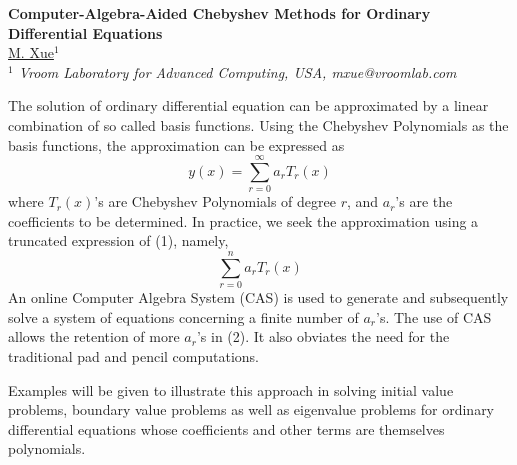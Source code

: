 \documentclass[11pt]{article}
\begin{document}
%
\vspace{-0.8cm}
\begin{flushleft}
\Large \textbf{\noindent
Computer-Algebra-Aided Chebyshev Methods for Ordinary Differential Equations}
\\
\vspace{0.5cm}
\normalsize
\normalsize{
 \underline{M. Xue}$^1$
} \\
\vspace{5mm}
\textit{\footnotesize
$^1$ Vroom Laboratory for Advanced Computing, USA,
 mxue@vroomlab.com\\
}
\end{flushleft}
The solution of ordinary differential equation can be approximated by a
linear combination of so called basis functions. Using the Chebyshev Polynomials
as the basis functions,  the approximation can be expressed as 
\begin{equation}
y(x)=\sum_{r=0}^{\infty} a_{r}T_r(x)
\end{equation}
where $T_{r}(x)$'s are Chebyshev Polynomials of degree $r$, and $a_{r}$'s are the 
coefficients to be determined. In practice, we seek the approximation using a truncated 
expression of (1), namely,
\begin{equation}
\sum_{r=0}^{n} a_{r}T_r(x)
\end{equation}
An online Computer Algebra System (CAS) is used to generate and subsequently solve a system of 
equations concerning a finite number of $a_r$'s. The use of CAS allows the retention of 
more $a_r$'s in (2). It also obviates the need for the traditional pad and pencil 
computations.

Examples will be given to illustrate this approach in solving initial value problems, 
boundary value problems as well as eigenvalue problems for ordinary differential equations
whose coefficients and other terms are themselves polynomials.
\end{document}
